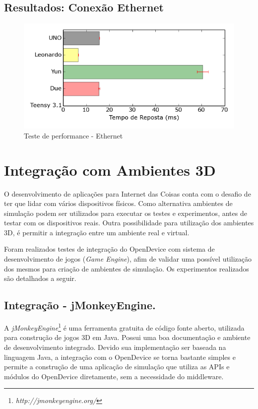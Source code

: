 \subsection{Resultados: Conexão Ethernet}

\begin{figure}[H]
\begin{centering}
\includegraphics[width=0.8\linewidth]{Imagens/Cap_5/ethernet}
\par\end{centering}
\caption{Teste de performance - Ethernet\label{fig:perf-ethernet}}
\end{figure}


\section{Integração com Ambientes 3D\label{sec:Integracao3D}}

O desenvolvimento de aplicações para Internet das Coisas conta com
o desafio de ter que lidar com vários dispositivos físicos. Como alternativa
ambientes de simulação podem ser utilizados para executar os testes
e experimentos, antes de testar com os dispositivos reais. Outra possibilidade
para utilização dos ambientes 3D, é permitir a integração entre um
ambiente real e virtual.

Foram realizados testes de integração do OpenDevice com sistema de
desenvolvimento de jogos (\emph{Game Engine}), afim de validar uma
possível utilização dos mesmos para criação de ambientes de simulação.
Os experimentos realizados são detalhados a seguir.

\subsection{Integração - jMonkeyEngine.}

A \emph{jMonkeyEngine}\footnote{\emph{http://jmonkeyengine.org/}}
é uma ferramenta gratuita de código fonte aberto, utilizada para construção
de jogos 3D em Java. Possui uma boa documentação e ambiente de desenvolvimento
integrado. Devido sua implementação ser baseada na linguagem Java,
a integração com o OpenDevice se torna bastante simples e permite
a construção de uma aplicação de simulação que utiliza as APIs e módulos
do OpenDevice diretamente, sem a necessidade do middleware. 

